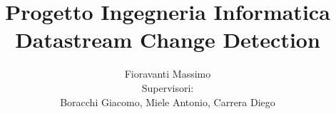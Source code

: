 \documentclass[a4paper]{article}
\begin{document}
	
	\author{Fioravanti Massimo\\[1cm]{Supervisori:}\\{ Boracchi Giacomo, Miele Antonio,  Carrera Diego } }
	\title{Progetto Ingegneria Informatica \\ Datastream Change Detection}
	\maketitle
	\tableofcontents
	\clearpage
	
	
	
	
	
	
	
\end{document}
